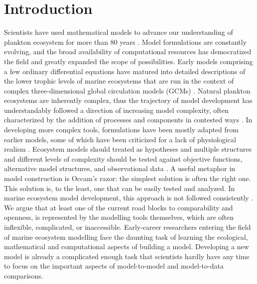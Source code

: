 \documentclass[journal abbreviation, manuscript]{copernicus}
\begin{document}

\section{Introduction}


Scientists have used mathematical models to advance our understanding of plankton ecosystem for more than 80 years \citep{Gentleman2002a}. Model formulations are constantly evolving, and the broad availability of computational resources has democratized the field and greatly expanded the scope of possibilities. Early models comprising a few ordinary differential equations \citep{Evans1985ACycles, Fasham1985FactorsFront} have matured into detailed descriptions of the lower trophic levels of marine ecosystems that are run in the context of complex three-dimensional global circulation models (GCMs) \citep[e.g.][]{Dutkiewicz2020DimensionsDiversity}. Natural plankton ecosystems are inherently complex, thus the trajectory of model development has understandably followed a direction of increasing model complexity, often characterized by the addition of processes and components in contested ways \citep{Anderson2005}. In developing more complex tools, formulations have been mostly adapted from earlier models, some of which have been criticized for a lack of physiological realism \citep{Smith2014}. Ecosystem models should treated as hypotheses and multiple structures and different levels of complexity should be tested against objective functions, alternative model structures, and observational data \citep{Franks2009}. A useful metaphor in model construction is Occam's razor: the simplest solution is often the right one. This solution is, to the least, one that can be easily tested and analyzed. In marine ecosystem model development, this approach is not followed consistently \citep{Shimoda2016}.
We argue that at least one of the current road blocks to comparability and openness, is represented by the modelling tools themselves, which are often inflexible, complicated, or inaccessible. Early-career researchers entering the field of marine ecosystem modelling face the daunting task of learning the ecological, mathematical and computational aspects of building a model. Developing a new model is already a complicated enough task that scientists hardly have any time to focus on the important aspects of model-to-model and model-to-data comparisons.
\end{document}
